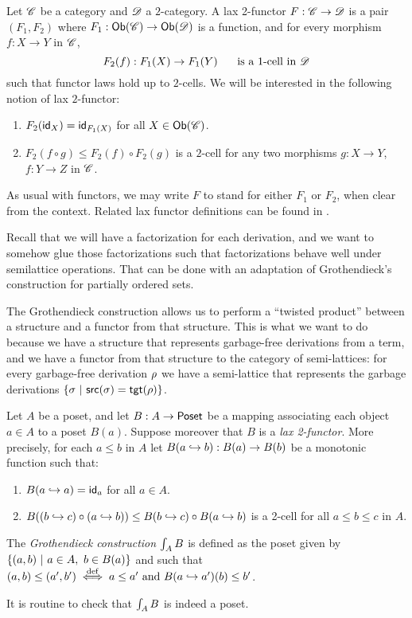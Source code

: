 \begin{definition}
Let $\Cat$ be a category and $\CatTwo$ a $2$-category.
A lax 2-functor $F : \Cat \to \CatTwo$
is a pair $(F_1,F_2)$ where $F_1 : \Ob(\Cat) \to \Ob(\CatTwo)$
is a function, and for every morphism $f : X \to Y$ in $\Cat$,
\[
  F_2(f) : F_1(X) \to F_1(Y) \HS\text{ is a 1-cell in $\CatTwo$}
\]
such that functor laws hold up to $2$-cells.
We will be interested in the following notion of lax $2$-functor:
\begin{enumerate}
\item $F_2(\id_X) = \id_{F_1(X)}$ for all $X \in \Ob(\Cat)$.
\item $F_2(f \circ g) \leq F_2(f) \circ F_2(g)$ is a $2$-cell
      for any two morphisms $g : X \to Y$, $f : Y \to Z$ in $\Cat$.
\end{enumerate}
As usual with functors, we may write $F$ to stand for either $F_1$ or $F_2$,
when clear from the context. Related lax functor definitions
can be found in \cite{StreetLaxFunctor}.
\end{definition}

Recall that we will have a factorization for each derivation,
and we want to somehow glue those factorizations such that
factorizations behave well under semilattice operations.
That can be done with an adaptation of Grothendieck's construction
for partially ordered sets.

The Grothendieck construction allows us to perform a ``twisted product''
between a structure and a functor from that structure.
This is what we want to do because we have a structure that
represents garbage-free derivations from a term,
and we have a functor from that structure to the category of semi-lattices:
for every garbage-free derivation $\redseq$ we have a semi-lattice that represents
the garbage derivations $\set{\redseqtwo \ |\ \src(\redseqtwo) = \tgt(\redseq)}$.

\begin{definition}
Let $A$ be a poset, and let $B : A \to \Poset$ be a mapping associating
each object $a \in A$ to a poset $B(a)$.
Suppose moreover that $B$ is a {\em lax 2-functor}.
More precisely,
for each $a \leq b$ in $A$ let $B(\pt{b}{a}) : B(a) \to B(b)$
be a monotonic function such that:
\begin{enumerate}
\item $B(\pt{a}{a}) = \id_a$ for all $a \in A$.
\item $B((\pt{c}{b}) \circ (\pt{b}{a})) \totwocell B(\pt{c}{b}) \circ B(\pt{b}{a})$ is a 2-cell for all $a \leq b \leq c$ in $A$.
\end{enumerate}
The {\em Grothendieck construction} $\grothy{A}{B}$
is defined as the poset
given by
$
  \set{(a,b) \ST a \in A,\ b \in B(a)}
$
and such that $(a, b) \leq (a', b') \iffdef a \leq a' \text{ and } B(\pt{a'}{a})(b) \leq b'$.
\end{definition}
It is routine to check that $\grothy{A}{B}$ is indeed a poset.


